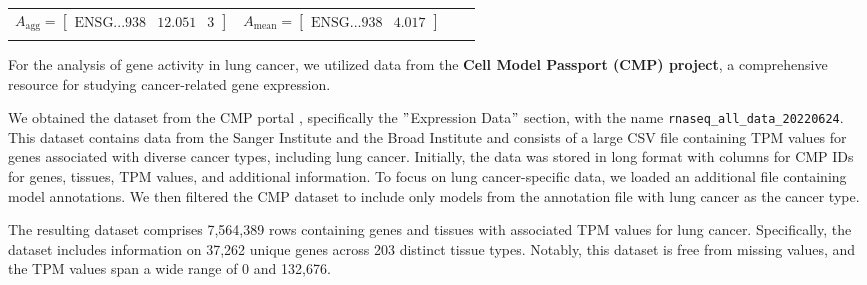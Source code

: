\begin{table}[h]
{\begin{tabular}{|c|c|c|c|}
        $ A_{\text{agg}} = \begin{bmatrix}
            \text{ENSG...938} & 12.051 & 3
        \end{bmatrix}$ &

        $ A_{\text{mean}} = \begin{bmatrix}
            \text{ENSG...938} & 4.017
        \end{bmatrix}$ \\

        & & & \\[1mm] %
        \hline
    \end{tabular}
    }
\end{table}


For the analysis of gene activity in lung cancer, we utilized data from the \textbf{Cell Model Passport (CMP) project},
a comprehensive resource for studying cancer-related gene expression.

We obtained the dataset from the CMP portal \cite{cmp_download}, specifically the $"$Expression Data$"$ section,
with the name \texttt{rnaseq\_all\_data\_20220624}.
This dataset contains data from the Sanger Institute and the Broad Institute and
consists of a large CSV file containing TPM values for genes associated with diverse cancer types, including lung cancer.
Initially, the data was stored in long format with columns for CMP IDs for genes, tissues, TPM values, and additional information.
To focus on lung cancer-specific data, we loaded an additional file containing model annotations. \cite{cmp_tissue_models}
We then filtered the CMP dataset to include only models from the annotation file with lung cancer as the cancer type.

The resulting dataset comprises 7,564,389 rows containing genes and tissues with associated TPM values for lung cancer.
Specifically, the dataset includes information on 37,262 unique genes across 203 distinct tissue types.
Notably, this dataset is free from missing values, and the TPM values span a wide range of 0 and 132,676.

